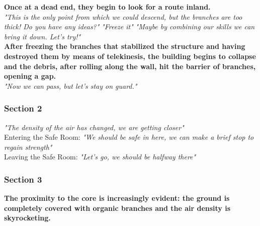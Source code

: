 \begin{dialogue}
	
	\textbf{Once at a dead end, they begin to look for a route inland.}\\
	
	
	 \textit{"This is the only point from which we could descend, but the branches are too thick! Do you have any ideas?"}
	 
	 
	 \textit{"Freeze it"}
	  \textit{"Maybe by combining our skills we can bring it down. Let's try!"}\\
	
	
	\textbf{After freezing the branches that stabilized the structure and having destroyed them by means of telekinesis, the building begins to collapse and the debris, after rolling along the wall, hit the barrier of branches, opening a gap.}\\
	
	
	 \textit{"Now we can pass, but let's stay on guard."}
	
\end{dialogue}


\subsubsection{Section 2}
\vspace*{0.3cm}

\begin{dialogue}
	 
	 \textit{"The density of the air has changed, we are getting closer"}\\
	
	Entering the Safe Room:
	 \textit{"We should be safe in here, we can make a brief stop to regain strength"}\\
	
	Leaving the Safe Room:
	 \textit{"Let's go, we should be halfway there"}
\end{dialogue}


\subsubsection{Section 3}
\vspace*{0.3cm}


	\textbf{The proximity to the core is increasingly evident: the ground is completely covered with organic branches and the air density is skyrocketing.}


